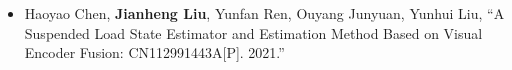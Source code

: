 %
%




\begin{itemize}
	\item Haoyao Chen, \textbf{Jianheng Liu}, Yunfan Ren, Ouyang Junyuan, Yunhui Liu, ``A Suspended Load State Estimator and Estimation Method Based on Visual Encoder Fusion: CN112991443A[P]. 2021.''\\
	\vspace{-8pt}
\end{itemize}